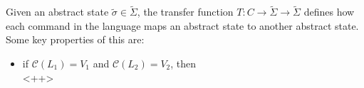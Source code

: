 \documentclass[class=scrartcl]{standalone}
\begin{document}
Given an abstract state \(\tilde\sigma \in \tilde\Sigma\),
the transfer function \(T \colon C \to \tilde\Sigma \to \tilde\Sigma\)
defines how each command in the language maps an abstract state
to another abstract state.
Some key properties of this are:
\begin{itemize}
  \item if \(\mathcal C(L_1) = V_1\) and \(\mathcal C(L_2) = V_2\), then
        \[
          
        \]
        <++>
\end{itemize}
\TODO[]
\end{document}
